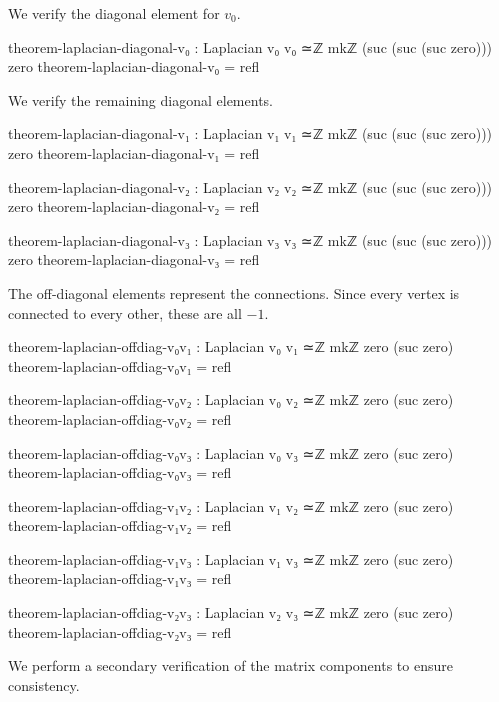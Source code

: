 \documentclass[11pt,a4paper]{book}
\begin{document}
We verify the diagonal element for $v_0$.

\begin{code}
theorem-laplacian-diagonal-v₀ : Laplacian v₀ v₀ ≃ℤ mkℤ (suc (suc (suc zero))) zero
theorem-laplacian-diagonal-v₀ = refl
\end{code}

We verify the remaining diagonal elements.

\begin{code}
theorem-laplacian-diagonal-v₁ : Laplacian v₁ v₁ ≃ℤ mkℤ (suc (suc (suc zero))) zero
theorem-laplacian-diagonal-v₁ = refl

theorem-laplacian-diagonal-v₂ : Laplacian v₂ v₂ ≃ℤ mkℤ (suc (suc (suc zero))) zero
theorem-laplacian-diagonal-v₂ = refl

theorem-laplacian-diagonal-v₃ : Laplacian v₃ v₃ ≃ℤ mkℤ (suc (suc (suc zero))) zero
theorem-laplacian-diagonal-v₃ = refl

\end{code}

The off-diagonal elements represent the connections. Since every vertex is connected to every other, these are all $-1$.

\begin{code}
theorem-laplacian-offdiag-v₀v₁ : Laplacian v₀ v₁ ≃ℤ mkℤ zero (suc zero)
theorem-laplacian-offdiag-v₀v₁ = refl

theorem-laplacian-offdiag-v₀v₂ : Laplacian v₀ v₂ ≃ℤ mkℤ zero (suc zero)
theorem-laplacian-offdiag-v₀v₂ = refl

theorem-laplacian-offdiag-v₀v₃ : Laplacian v₀ v₃ ≃ℤ mkℤ zero (suc zero)
theorem-laplacian-offdiag-v₀v₃ = refl

theorem-laplacian-offdiag-v₁v₂ : Laplacian v₁ v₂ ≃ℤ mkℤ zero (suc zero)
theorem-laplacian-offdiag-v₁v₂ = refl

theorem-laplacian-offdiag-v₁v₃ : Laplacian v₁ v₃ ≃ℤ mkℤ zero (suc zero)
theorem-laplacian-offdiag-v₁v₃ = refl

theorem-laplacian-offdiag-v₂v₃ : Laplacian v₂ v₃ ≃ℤ mkℤ zero (suc zero)
theorem-laplacian-offdiag-v₂v₃ = refl

\end{code}

We perform a secondary verification of the matrix components to ensure consistency.
\end{document}
